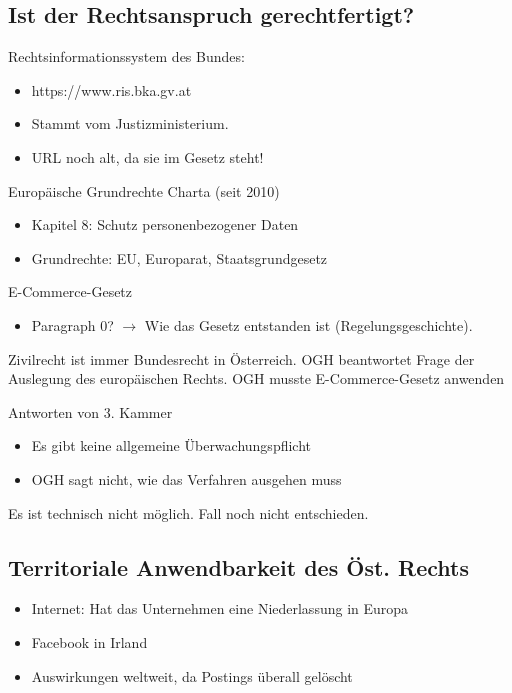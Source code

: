 \documentclass[12pt]{article}
\begin{document}
    \subsection{Ist der Rechtsanspruch gerechtfertigt?}
    Rechtsinformationssystem des Bundes:
    \begin{itemize}
        \item https://www.ris.bka.gv.at
        \item Stammt vom Justizministerium.
        \item URL noch alt, da sie im Gesetz steht!
    \end{itemize}

    Europäische Grundrechte Charta (seit 2010)
    \begin{itemize}
        \item Kapitel 8: Schutz personenbezogener Daten
        \item Grundrechte: EU, Europarat, Staatsgrundgesetz
    \end{itemize}

    E-Commerce-Gesetz
    \begin{itemize}
        \item Paragraph 0? \(\rightarrow\) Wie das Gesetz entstanden ist (Regelungsgeschichte).
    \end{itemize}

    Zivilrecht ist immer Bundesrecht in Österreich.
    OGH beantwortet Frage der Auslegung des europäischen Rechts.
    OGH musste E-Commerce-Gesetz anwenden
    
    Antworten von 3. Kammer
    \begin{itemize}
        \item Es gibt keine allgemeine Überwachungspflicht
        \item OGH sagt nicht, wie das Verfahren ausgehen muss
    \end{itemize}

    Es ist technisch nicht möglich.
    Fall noch nicht entschieden.

    \subsection{Territoriale Anwendbarkeit des Öst. Rechts}
    \begin{itemize}
        \item Internet: Hat das Unternehmen eine Niederlassung in Europa
        \item Facebook in Irland
        \item Auswirkungen weltweit, da Postings überall gelöscht
    \end{itemize}
\end{document}
